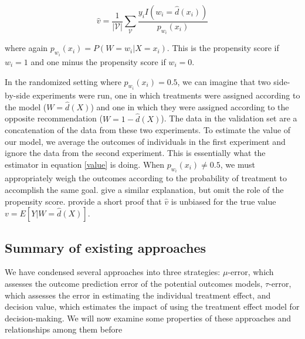 \begin{equation}
\label{value}
\hat v = \frac{1}{|\mathcal{V}|}\sum_{\mathcal{V}} \frac{y_i I(w_i=\hat d(x_i))}{p_{w_i}(x_i)}
\end{equation}

where again $p_{w_i}(x_i) = P(W=w_i | X=x_i)$. This is the propensity score if $w_i = 1$ and one minus the propensity score if $w_i = 0$.

In the randomized setting where $p_{w_i}(x_i) = 0.5$, we can imagine that two side-by-side experiments were run, one in which treatments were assigned according to the model ($W = \hat d(X)$) and one in which they were assigned according to the opposite recommendation ($W = 1 - \hat d(X)$). The data in the validation set are a concatenation of the data from these two experiments. To estimate the value of our model, we average the outcomes of individuals in the first experiment and ignore the data from the second experiment. This is essentially what the estimator in equation \ref{value} is doing. When $p_{w_i}(x_i) \ne 0.5$, we must appropriately weigh the outcomes according to the probability of treatment to accomplish the same goal. \citet{Kapelner:3baXYEjR} give a similar explanation, but omit the role of the propensity score. \citet{Zhao:2017wa} provide a short proof that $\hat v$ is unbiased for the true value $v = E[Y|W = \hat d(X)]$. 

\subsection{Summary of existing approaches}

We have condensed several approaches into three strategies: $\mu$-error, which assesses the outcome prediction error of the potential outcomes models, $\tau$-error, which assesses the error in estimating the individual treatment effect, and decision value, which estimates the impact of using the treatment effect model for decision-making. We will now examine some properties of these approaches and relationships among them before 
